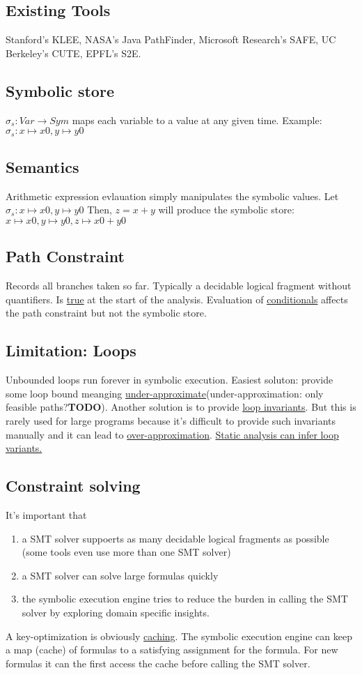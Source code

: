 \subsection{Existing Tools}
Stanford's KLEE, NASA's Java PathFinder, Microsoft Research's SAFE, UC Berkeley's CUTE, EPFL's S2E.
\subsection{Symbolic store}
$\sigma_s:Var \to Sym$ maps each variable to a value at any given time. Example: $\sigma_s: x \mapsto x0, y \mapsto y0$
\subsection{Semantics}
Arithmetic expression evlauation simply manipulates the symbolic values. Let $\sigma_s: x \mapsto x0, y \mapsto y0$ Then, $z=x+y$ will produce the symbolic store: $x \mapsto x0, y \mapsto y0, z\mapsto x0+y0$ 
\subsection{Path Constraint}
Records all branches taken so far. Typically a decidable logical fragment without quantifiers. Is \underline{true} at the start of the analysis. Evaluation of \underline{conditionals} affects the path constraint but not the symbolic store.
\subsection{Limitation: Loops}
Unbounded loops run forever in symbolic execution. Easiest soluton: provide some loop bound meanging \underline{under-approximate}(under-approximation: only feasible paths?\textbf{TODO}). Another solution is to provide \underline{loop invariants}. But this is rarely used for large programs because it's difficult to provide such invariants manually and it can lead to \underline{over-approximation}. \underline{Static analysis can infer loop variants.} 
\subsection{Constraint solving}
It's important that
\begin{enumerate}
\item  a SMT solver suppoerts as many decidable logical fragments as possible (some tools even use more than one SMT solver)
\item  a SMT solver can solve large formulas quickly
\item the symbolic execution engine tries to reduce the burden in calling the SMT solver by exploring domain specific insights.
\end{enumerate}
A key-optimization is obviously \underline{caching}. The symbolic execution engine can keep a map (cache) of formulas to a satisfying assignment for the formula. For new formulas it can the first access the cache before calling the SMT solver.

